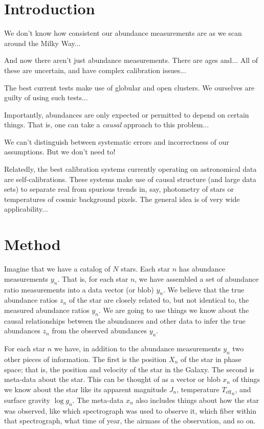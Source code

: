 \documentclass[12pt, letterpaper]{article}
\newcommand{\teff}{{T_{\mathrm{eff}}}}
\newcommand{\logg}{\log g}
\begin{document}
\section{Introduction}

We don't know how consistent our abundance measurements are as we scan
around the Milky Way...

And now there aren't just abundance measurements.
There are ages and...
All of these are uncertain, and have complex calibration issues...

The best current tests make use of globular and open clusters.
We ourselves are guilty of using such tests...

Importantly, abundances are only expected or permitted to depend on certain
things.
That is, one can take a \emph{causal} approach to this problem...

We can't distinguish between systematic errors and incorrectness of
our assumptions. But we don't need to!

Relatedly, the best calibration systems currently operating on astronomical
data are self-calibrations.
These systems make use of causal structure (and large data sets) to
separate real from spurious trends in, say, photometry of stars or
temperatures of cosmic background pixels.
The general idea is of very wide applicability...

\section{Method}

Imagine that we have a catalog of $N$ stars.
Each star $n$ has abundance measurements $y_n$.
That is, for each star $n$, we have assembled a set of abundance ratio
measurements into a data vector (or blob) $y_n$.
We believe that the true abundance ratios $z_n$ of the star are
closely related to, but not identical to, the measured abundance
ratios $y_n$.
We are going to use things we know about the causal relationships
between the abundances and other data to infer the true abundances
$z_n$ from the observed abundances $y_n$.

For each star $n$ we have, in addition to the abundance measurements
$y_n$ two other pieces of information.
The first is the position $X_n$ of the star in phase space; that is,
the position and velocity of the star in the Galaxy.
The second is meta-data about the star.
This can be thought of as a vector or blob $x_n$ of things we know
about the star like its apparent magnitude $J_n$, temperature
$\teff_n$, and surface gravity $\logg_n$.
The meta-data $x_n$ also includes things about how the star was
observed, like which spectrograph was used to observe it, which fiber
within that spectrograph, what time of year, the airmass of the
observation, and so on.
\end{document}
